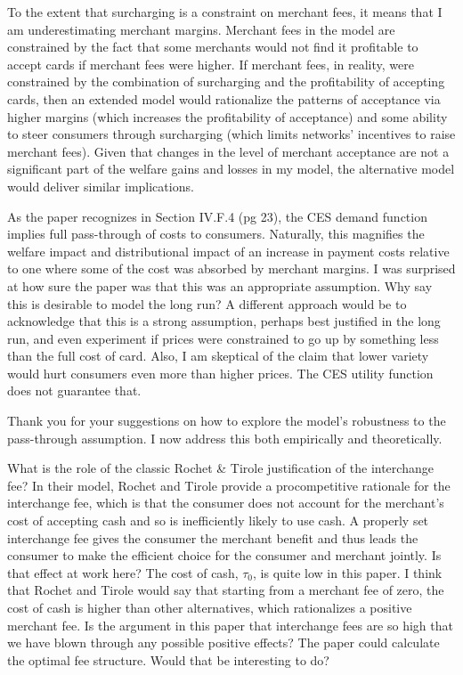 \documentclass[main.tex]{subfiles}
\begin{document}
\begin{refsection}
To the extent that surcharging is a constraint on merchant fees, it means that I am underestimating merchant margins.
Merchant fees in the model are constrained by the fact that some merchants would not find it profitable to accept cards if merchant fees were higher.
If merchant fees, in reality, were constrained by the combination of surcharging and the profitability of accepting cards, then an extended model would rationalize the patterns of acceptance via higher margins (which increases the profitability of acceptance) and some ability to steer consumers through surcharging (which limits networks' incentives to raise merchant fees).
Given that changes in the level of merchant acceptance are not a significant part of the welfare gains and losses in my model, the alternative model would deliver similar implications.

\begin{refcomment}
As the paper recognizes in Section IV.F.4 (pg 23), the CES demand function implies full pass-through of costs to consumers.
Naturally, this magnifies the welfare impact and distributional impact of an increase in payment costs relative to one where some of the cost was absorbed by merchant margins.
I was surprised at how sure the paper was that this was an appropriate assumption.
Why say this is desirable to model the long run?
A different approach would be to acknowledge that this is a strong assumption, perhaps best justified in the long run, and even experiment if prices were constrained to go up by something less than the full cost of card.
Also, I am skeptical of the claim that lower variety would hurt consumers even more than higher prices.
The CES utility function does not guarantee that.
\end{refcomment}

Thank you for your suggestions on how to explore the model's robustness to the pass-through assumption.
I now address this both empirically and theoretically.
\replypassthrough

\begin{refcomment}
What is the role of the classic Rochet \& Tirole justification of the interchange fee?
In their model, Rochet and Tirole provide a procompetitive rationale for the interchange fee, which is that the consumer does not account for the merchant’s cost of accepting cash and so is inefficiently likely to use cash.
A properly set interchange fee gives the consumer the merchant benefit and thus leads the consumer to make the efficient choice for the consumer and merchant jointly.
Is that effect at work here?
The cost of cash, \(\tau_0\), is quite low in this paper.
I think that Rochet and Tirole would say that starting from a merchant fee of zero, the cost of cash is higher than other alternatives, which rationalizes a positive merchant fee.
Is the argument in this paper that interchange fees are so high that we have blown through any possible positive effects?
The paper could calculate the optimal fee structure.
Would that be interesting to do?
\end{refcomment}


\end{refsection}
\end{document}
